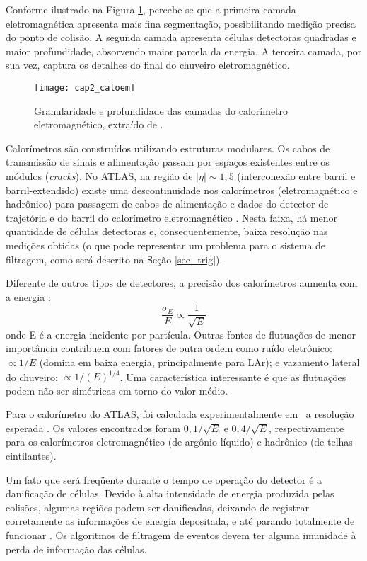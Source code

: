 Conforme ilustrado na Figura \ref{calo_cell}, percebe-se que a
primeira camada eletromagnética apresenta mais fina segmentação,
possibilitando medição precisa do ponto de colisão. A segunda camada
apresenta células detectoras quadradas e maior profundidade,
absorvendo maior parcela da energia. A terceira camada, por sua vez,
captura os detalhes do final do chuveiro eletromagnético.

\begin{figure}[h]
\centering
\texttt{[image: cap2\_caloem]}
\caption{Granularidade e profundidade das camadas do calorímetro
eletromagnético, extraído de \cite{article:ATLAS:2008}.} \label{calo_cell}
\end{figure}

Calorímetros são construídos utilizando estruturas modulares. Os cabos de transmissão de sinais e alimentação passam por espaços existentes entre os módulos (\textit{cracks}). No ATLAS, na região de $|\eta|\sim 1,5$ (interconexão entre barril e
barril-extendido) existe uma descontinuidade nos calorímetros
(eletromagnético e hadrônico) para passagem de cabos de alimentação
e dados do detector de trajetória e do barril do calorímetro
eletromagnético \cite{article:ATLAS:2008}. Nesta faixa, há menor
quantidade de células detectoras e, consequentemente, baixa
resolução nas medições obtidas (o que pode representar um problema
para o sistema de filtragem, como será descrito na Seção
\ref{sec_trig}).

Diferente de outros tipos de detectores, a precisão dos calorímetros aumenta com a energia \cite{book:wigmans:2000}:
\begin{equation}\label{res_calo}
    \frac{\sigma_E}{E} \propto \frac{1}{\sqrt{E}}
\end{equation}
onde E é a energia incidente por partícula. Outras fontes de flutuações de menor importância contribuem com fatores de outra ordem como ruído eletrônico: $\propto 1/E$ (domina em baixa energia, principalmente para LAr); e
vazamento lateral do chuveiro: $ \propto 1/(E)^{1/4}$. Uma característica interessante é que as flutuações podem não ser simétricas em torno do valor médio.

Para o calorímetro do ATLAS, foi calculada
experimentalmente em~\cite{atlascalo:2002} a resolução esperada . Os valores encontrados foram $0,1/\sqrt{E}$
e $0,4/\sqrt{E}$, respectivamente para os calorímetros
eletromagnético (de argônio líquido) e hadrônico (de telhas
cintilantes).

Um fato que será freqüente durante o tempo de operação do detector é
a da\-ni\-fi\-cação de células. Devido à alta intensidade de energia
produzida pelas colisões, algumas regiões podem ser danificadas,
deixando de registrar corretamente as informações de energia
depositada, e até parando totalmente de funcionar
\cite{TP:ATLAS:1994}. Os algoritmos de filtragem de eventos devem
ter alguma imunidade à perda de informação das células.

